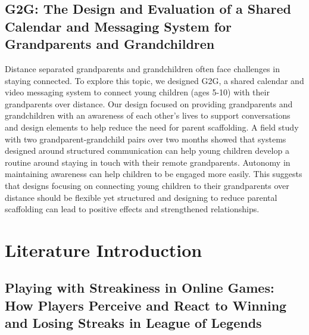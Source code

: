 \subsection{G2G: The Design and Evaluation of a Shared Calendar and
Messaging System for Grandparents and Grandchildren }

Distance separated grandparents and grandchildren often
face challenges in staying connected. To explore this topic,
we designed G2G, a shared calendar and video messaging
system to connect young children (ages 5-10) with their
grandparents over distance. Our design focused on
providing grandparents and grandchildren with an
awareness of each other’s lives to support conversations
and design elements to help reduce the need for parent
scaffolding. A field study with two grandparent-grandchild
pairs over two months showed that systems designed
around structured communication can help young children
develop a routine around staying in touch with their remote
grandparents. Autonomy in maintaining awareness can help
children to be engaged more easily. This suggests that
designs focusing on connecting young children to their
grandparents over distance should be flexible yet structured
and designing to reduce parental scaffolding can lead to
positive effects and strengthened relationships.

\section{Literature Introduction}

\subsection{Playing with Streakiness in Online Games: How Players
Perceive and React to Winning and Losing Streaks in
League of Legends }

